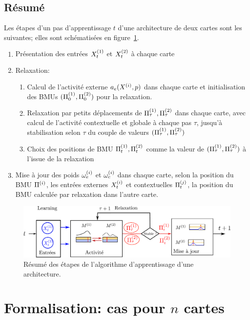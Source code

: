 \subsection{Résumé}
Les étapes d'un pas d'apprentissage $t$ d'une architecture de deux cartes sont les suivantes; elles sont schématisées en figure~\ref{fig:algo}.
\begin{enumerate}
\item Présentation des entrées $X^{({1})}_t$ et $X^{({2})}_t$ à chaque carte
\item Relaxation:
\begin{enumerate}
\item Calcul de l'activité externe $a_e(X^{({i})},p)$ dans chaque carte et initialisation des BMUs $(\Pi^{({1})}_0,\Pi^{({2})}_0)$ pour la relaxation.
\item Relaxation par petits déplacements de $\Pi^{({1})}_\tau,\Pi^{({2})}_\tau$ dans chaque carte, avec calcul de l'activité contextuelle et globale à chaque pas $\tau$, jusqu'à stabilisation selon $\tau$ du couple de valeurs $(\Pi^{({1})}_\tau,\Pi^{({2})}_\tau)$
\item Choix des positions de BMU $\Pi^{({1})}_t,\Pi^{({2})}_t$ comme la valeur de $(\Pi^{({1})}_\tau,\Pi^{({2})}_\tau)$ à l'issue de la relaxation
\end{enumerate}
\item Mise à jour des poids $\omega_{e}^{({i})}$ et $\omega_{c}^{({i})}$ dans chaque carte, selon la position du BMU $\Pi^{({i})}$, les entrées externes $X^{({i})}_t$ et contextuelles $\Pi^{({j})}_t$, la position du BMU calculée par relaxation dans l'autre carte.
\end{enumerate}
\begin{figure}
\centering
\includegraphics[width=\textwidth]{learning_tests_2maps}
\caption{Résumé des étapes de l'algorithme d'apprentissage d'une architecture.}
\label{fig:algo}
\end{figure}


\section{Formalisation: cas pour $n$ cartes}\label{sec:formalisme}

